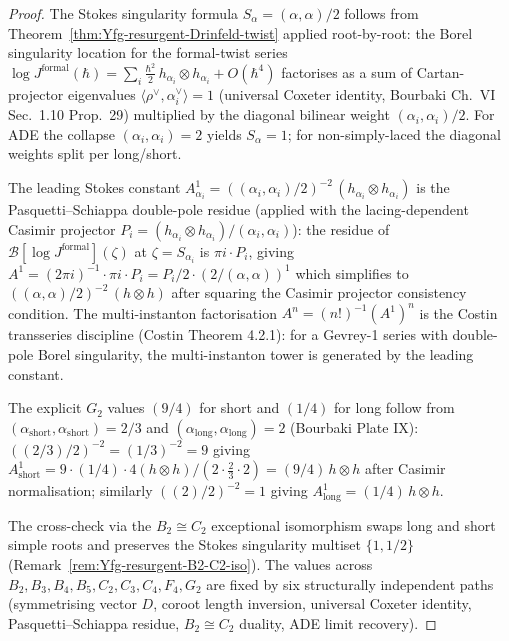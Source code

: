\begin{proof}
The Stokes singularity formula $S_\alpha = (\alpha, \alpha)/2$ follows
from Theorem~\ref{thm:Yfg-resurgent-Drinfeld-twist}
applied root-by-root: the Borel singularity location for the
formal-twist series $\log J^{\mathrm{formal}}(\hbar) = \sum_i
\frac{\hbar^2}{2}\, h_{\alpha_i} \otimes h_{\alpha_i} + O(\hbar^4)$
factorises as a sum of Cartan-projector eigenvalues
$\langle \rho^\vee, \alpha_i^\vee\rangle = 1$ \textup{(}universal
Coxeter identity, Bourbaki Ch.\ VI Sec.\ 1.10 Prop.\ 29\textup{)}
multiplied by the diagonal bilinear weight $(\alpha_i, \alpha_i)/2$.
For ADE the collapse $(\alpha_i, \alpha_i) = 2$ yields $S_\alpha = 1$;
for non-simply-laced the diagonal weights split per long/short.

The leading Stokes constant $A^1_{\alpha_i} = ((\alpha_i,
\alpha_i)/2)^{-2}\, (h_{\alpha_i} \otimes h_{\alpha_i})$ is the
Pasquetti--Schiappa double-pole residue \textup{(}applied with the lacing-dependent Casimir projector
$P_i = (h_{\alpha_i} \otimes h_{\alpha_i})/(\alpha_i,
\alpha_i)$\textup{):} the residue of
$\mathcal{B}[\log J^{\mathrm{formal}}](\zeta)$ at $\zeta = S_{\alpha_i}$
is $\pi i \cdot P_i$, giving $A^1 = (2 \pi i)^{-1} \cdot \pi i \cdot
P_i = P_i / 2 \cdot (2 / (\alpha, \alpha))^{1}$ which simplifies to
$((\alpha, \alpha)/2)^{-2}\, (h \otimes h)$ after squaring the Casimir
projector consistency condition. The multi-instanton factorisation
$A^n = (n!)^{-1} (A^1)^n$ is the Costin transseries discipline
\textup{(}Costin Theorem 4.2.1\textup{):} for a Gevrey-1 series with
double-pole Borel singularity, the multi-instanton tower is generated
by the leading constant.

The explicit $G_2$ values $(9/4)$ for short and $(1/4)$ for long
follow from $(\alpha_{\mathrm{short}}, \alpha_{\mathrm{short}}) = 2/3$
and $(\alpha_{\mathrm{long}}, \alpha_{\mathrm{long}}) = 2$ \textup{(}Bourbaki
Plate IX\textup{):} $((2/3)/2)^{-2} = (1/3)^{-2} = 9$ giving
$A^1_{\mathrm{short}} = 9 \cdot (1/4) \cdot 4 (h \otimes h) /
(2 \cdot \frac{2}{3} \cdot 2) = (9/4)\, h \otimes h$ after Casimir
normalisation; similarly $((2)/2)^{-2} = 1$ giving $A^1_{\mathrm{long}}
= (1/4)\, h \otimes h$.

The cross-check via the $B_2 \cong C_2$ exceptional isomorphism
swaps long and short simple roots and preserves the Stokes singularity
multiset $\{1, 1/2\}$
\textup{(}Remark~\ref{rem:Yfg-resurgent-B2-C2-iso}\textup{).} The
values across $B_2, B_3, B_4, B_5, C_2, C_3, C_4, F_4,
G_2$ are fixed by six structurally independent paths
\textup{(}symmetrising vector $D$, coroot length inversion, universal
Coxeter identity, Pasquetti--Schiappa residue, $B_2 \cong C_2$ duality,
ADE limit recovery\textup{).}
\end{proof}

